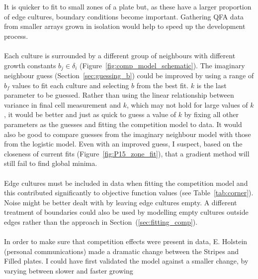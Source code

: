 It is quicker to fit to small zones of a plate but, as these have a
larger proportion of edge cultures, boundary conditions become
important. Gathering QFA data from smaller arrays grown in isolation
would help to speed up the development process.
\\\\
Each culture is surrounded by a different group of neighbours with
different growth constants \(b_{j} \in \delta_{i}\)
(Figure~\ref{fig:comp_model_schematic}). The imaginary neighbour guess
(Section~\ref{sec:guessing_b}) could be improved by using a range of
\(b_{f}\) values to fit each culture and selecting \(b\) from the best
fit. \(k\) is the last parameter to be guessed. Rather than using the
linear relationship between variance in final cell measurement and
\(k\), which may not hold for large values of \(k\), it would be
better and just as quick to guess a value of \(k\) by fixing all other
parameters as the guesses and fitting the competition model to
data. It would also be good to compare guesses from the imaginary
neighbour model with those from the logistic model. Even with an
improved guess, I suspect, based on the closeness of current fits
(Figure~\ref{fig:P15_zone_fit}), that a gradient method will still
fail to find global minima.
\\\\
Edge cultures must be included in data when fitting the competition
model and this contributed significantly to objective function values
(see Table~\ref{tab:corner}). Noise might be better dealt with by
leaving edge cultures empty. A different treatment of boundaries could
also be used by modelling empty cultures outside edges rather than the
approach in Section~(\ref{sec:fitting_comp}).
\\\\
In order to make sure that competition effects were present in data,
E. Holstein (personal communications) made a dramatic change between
the Stripes and Filled plates. I could have first validated the model
against a smaller change, by varying between slower and faster growing

